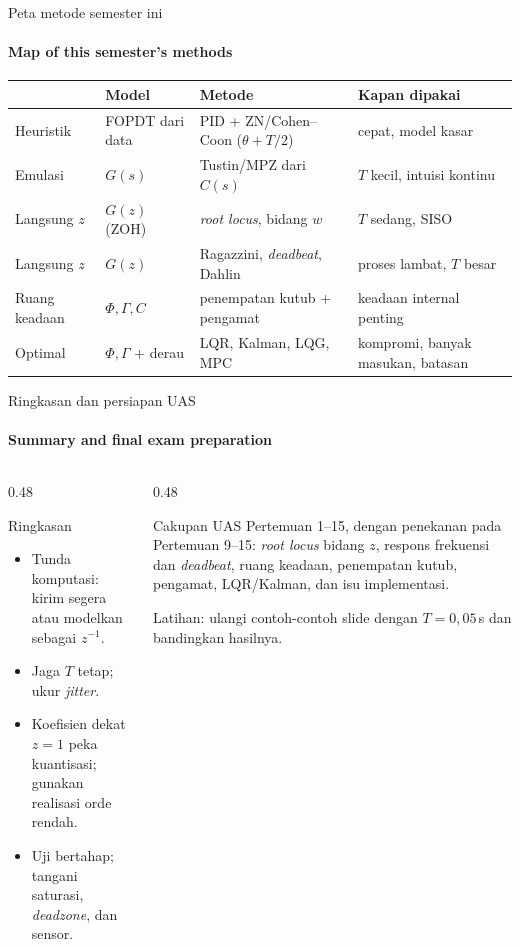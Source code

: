 \documentclass[aspectratio=169,10pt]{beamer}
\begin{document}
\begin{frame}{Peta metode semester ini}
	\framesubtitle{Map of this semester's methods}
	\centering
	\small
	\renewcommand{\arraystretch}{1.35}
	\begin{tabular}{@{}l l l l@{}}
		\toprule
		 & \textbf{Model} & \textbf{Metode} & \textbf{Kapan dipakai} \\
		\midrule
		Heuristik & FOPDT dari data & PID + ZN/Cohen--Coon ($\theta + T/2$) & cepat, model kasar \\
		Emulasi & $G(s)$ & Tustin/MPZ dari $C(s)$ & $T$ kecil, intuisi kontinu \\
		Langsung $z$ & $G(z)$ (ZOH) & \textit{root locus}, bidang $w$ & $T$ sedang, SISO \\
		Langsung $z$ & $G(z)$ & Ragazzini, \textit{deadbeat}, Dahlin & proses lambat, $T$ besar \\
		Ruang keadaan & $\Phi, \Gamma, C$ & penempatan kutub + pengamat & keadaan internal penting \\
		Optimal & $\Phi, \Gamma$ + derau & LQR, Kalman, LQG, MPC & kompromi, banyak masukan, batasan \\
		\bottomrule
	\end{tabular}

	\vspace{0.3cm}
\end{frame}

\begin{frame}{Ringkasan dan persiapan UAS}
	\framesubtitle{Summary and final exam preparation}
	\begin{columns}[T]
		\begin{column}{0.48\textwidth}
			\begin{block}{Ringkasan}
				\small
				\begin{itemize}
					\item Tunda komputasi: kirim segera atau modelkan sebagai $z^{-1}$.
					\item Jaga $T$ tetap; ukur \textit{jitter}.
					\item Koefisien dekat $z=1$ peka kuantisasi; gunakan realisasi orde rendah.
					\item Uji bertahap; tangani saturasi, \textit{deadzone}, dan sensor.
				\end{itemize}
			\end{block}
		\end{column}
		\begin{column}{0.48\textwidth}
			\begin{exampleblock}{Cakupan UAS}
				\small
				Pertemuan 1--15, dengan penekanan pada Pertemuan 9--15: \textit{root locus} bidang $z$, respons frekuensi dan \textit{deadbeat}, ruang keadaan, penempatan kutub, pengamat, LQR/Kalman, dan isu implementasi.
			\end{exampleblock}
			{\small Latihan: ulangi contoh-contoh slide dengan $T = 0{,}05$\,s dan bandingkan hasilnya.}
		\end{column}
	\end{columns}
\end{frame}
\end{document}
